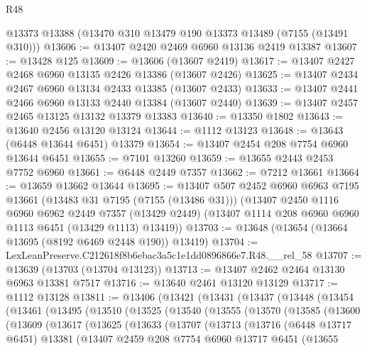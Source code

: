 \begin{lexlean}{R48}
\begin{coremodule}
    @13373
    @13388
    (@13470 @310 @13479 @190 @13373 @13489 (@7155 (@13491 @310)))
@13606 := @13407 @2420 @2469 @6960 @13136 @2419 @13387
@13607 := @13428 @125
@13609 := @13606 (@13607 @2419)
@13617 := @13407 @2427 @2468 @6960 @13135 @2426 @13386 (@13607 @2426)
@13625 := @13407 @2434 @2467 @6960 @13134 @2433 @13385 (@13607 @2433)
@13633 := @13407 @2441 @2466 @6960 @13133 @2440 @13384 (@13607 @2440)
@13639 := @13407 @2457 @2465 @13125 @13132 @13379 @13383
@13640 := @13350 @1802
@13643 := @13640 @2456 @13120 @13124
@13644 := @1112 @13123
@13648 := @13643 (@6448 @13644 @6451) @13379
@13654 := @13407 @2454 @208 @7754 @6960 @13644 @6451
@13655 := @7101 @13260
@13659 := @13655 @2443 @2453 @7752 @6960
@13661 := @6448 @2449 @7357
@13662 := @7212 @13661
@13664 := @13659 @13662 @13644
@13695 := @13407
    @507
    @2452
    @6960
    @6963
    @7195
    @13661
    (@13483 @31 @7195 (@7155 (@13486 @31)))
    (@13407
      @2450
      @1116
      @6960
      @6962
      @2449
      @7357
      (@13429 @2449)
      (@13407 @1114 @208 @6960 @6960 @1113 @6451 (@13429 @1113) @13419))
@13703 := @13648 (@13654 (@13664 @13695 (@8192 @6469 @2448 @190)) @13419)
@13704 := LexLeanPreserve.C212618f8b6ebac3a5c1e1dd0896866e7.R48.__rel_58
@13707 := @13639 (@13703 (@13704 @13123))
@13713 := @13407 @2462 @2464 @13130 @6963 @13381 @7517
@13716 := @13640 @2461 @13120 @13129
@13717 := @1112 @13128
@13811 := @13406
    (@13421
      (@13431
        (@13437
          (@13448
            (@13454
              (@13461
                (@13495
                  (@13510
                    (@13525
                      (@13540
                        (@13555
                          (@13570
                            (@13585
                              (@13600
                                (@13609
                                  (@13617
                                    (@13625
                                      (@13633
                                        (@13707
                                          (@13713
                                            (@13716
                                              (@6448 @13717 @6451)
                                              @13381
                                              (@13407
                                                @2459
                                                @208
                                                @7754
                                                @6960
                                                @13717
                                                @6451
                                                (@13655

\end{coremodule}
\end{lexlean}
